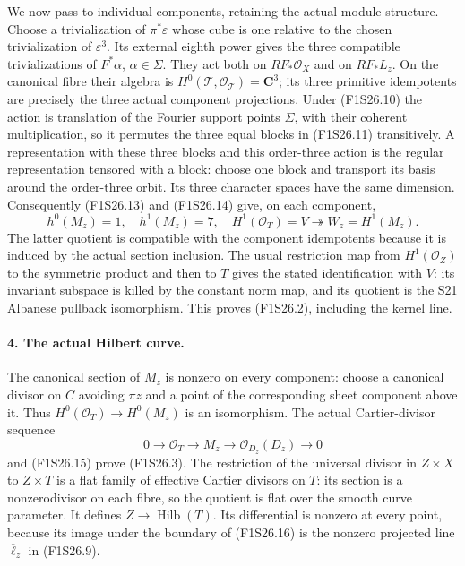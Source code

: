 We now pass to individual components, retaining the actual
module structure. Choose a trivialization of $\pi^*\varepsilon$
whose cube is one relative to the chosen trivialization of
$\varepsilon^3$. Its external eighth power gives the three
compatible trivializations of $F^*\alpha$, $\alpha\in\Sigma$.
They act both on $RF_*\mathcal O_X$ and on $RF_*L_z$.
On the canonical fibre their algebra is
$H^0(\mathcal T,\mathcal O_{\mathcal T})=\mathbf C^3$;
its three primitive idempotents are precisely the three
actual component projections. Under (F1S26.10) the action
is translation of the Fourier support points $\Sigma$,
with their coherent multiplication, so it permutes the
three equal blocks in (F1S26.11) transitively. A representation
with these three blocks and this order-three action is the
regular representation tensored with a block: choose one
block and transport its basis around the order-three orbit.
Its three character spaces have the same dimension.
Consequently (F1S26.13) and (F1S26.14) give, on each component,
\[
 h^0(M_z)=1,\quad h^1(M_z)=7,
 \quad H^1(\mathcal O_T)=V\twoheadrightarrow W_z=H^1(M_z).
 \tag{F1S26.15}
\]
The latter quotient is compatible with the component
idempotents because it is induced by the actual section
inclusion. The usual restriction map from $H^1(\mathcal O_Z)$
to the symmetric product and then to $T$ gives the stated
identification with $V$: its invariant subspace is killed
by the constant norm map, and its quotient is the S21
Albanese pullback isomorphism. This proves (F1S26.2),
including the kernel line.

\paragraph{4. The actual Hilbert curve.}
The canonical section of $M_z$ is nonzero on every component:
choose a canonical divisor on $C$ avoiding $\pi z$ and a
point of the corresponding sheet component above it.
Thus $H^0(\mathcal O_T)\to H^0(M_z)$ is an isomorphism.
The actual Cartier-divisor sequence
\[
 0\longrightarrow\mathcal O_T\longrightarrow M_z
       \longrightarrow\mathcal O_{D_z}(D_z)\longrightarrow0
 \tag{F1S26.16}
\]
and (F1S26.15) prove (F1S26.3). The restriction of the
universal divisor in $Z\times X$ to $Z\times T$ is a
flat family of effective Cartier divisors on $T$: its
section is a nonzerodivisor on each fibre, so the quotient
is flat over the smooth curve parameter. It defines
$Z\to\operatorname{Hilb}(T)$. Its differential is nonzero
at every point, because its image under the boundary of
(F1S26.16) is the nonzero projected line
$\overline\ell_z$ in (F1S26.9).

